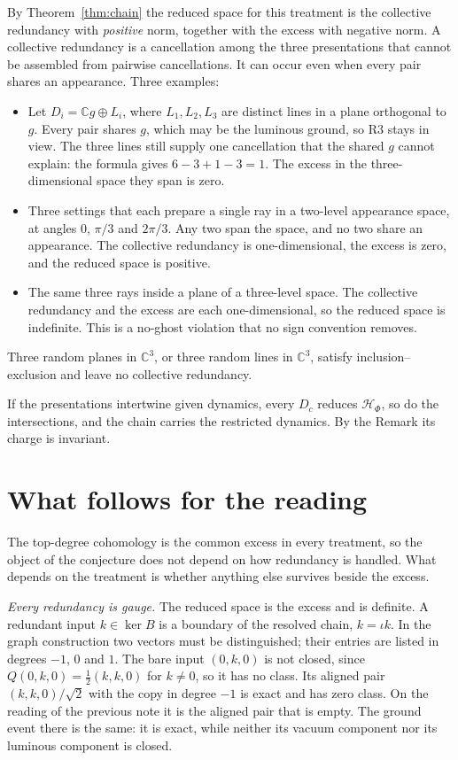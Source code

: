 \documentclass[11pt]{article}
\theoremstyle{remark}
\newcommand{\C}{\mathbb C}
\newcommand{\HF}{\mathcal H_\Phi}
\begin{document}
By Theorem~\ref{thm:chain} the reduced space for this treatment is the collective redundancy with \emph{positive} norm, together with the excess with negative norm. A collective redundancy is a cancellation among the three presentations that cannot be assembled from pairwise cancellations. It can occur even when every pair shares an appearance. Three examples:
\begin{itemize}
\item Let $D_i=\C g\oplus L_i$, where $L_1,L_2,L_3$ are distinct lines in a plane orthogonal to $g$. Every pair shares $g$, which may be the luminous ground, so R3 stays in view. The three lines still supply one cancellation that the shared $g$ cannot explain: the formula gives $6-3+1-3=1$. The excess in the three-dimensional space they span is zero.
\item Three settings that each prepare a single ray in a two-level appearance space, at angles $0$, $\pi/3$ and $2\pi/3$. Any two span the space, and no two share an appearance. The collective redundancy is one-dimensional, the excess is zero, and the reduced space is positive.
\item The same three rays inside a plane of a three-level space. The collective redundancy and the excess are each one-dimensional, so the reduced space is indefinite. This is a no-ghost violation that no sign convention removes.
\end{itemize}
Three random planes in $\C^3$, or three random lines in $\C^3$, satisfy inclusion--exclusion and leave no collective redundancy.

If the presentations intertwine given dynamics, every $D_c$ reduces $\HF$, so do the intersections, and the chain carries the restricted dynamics. By the Remark its charge is invariant.

\section{What follows for the reading}

The top-degree cohomology is the common excess in every treatment, so the object of the conjecture does not depend on how redundancy is handled. What depends on the treatment is whether anything else survives beside the excess.

\emph{Every redundancy is gauge.} The reduced space is the excess and is definite. A redundant input $k\in\ker B$ is a boundary of the resolved chain, $k=\iota k$. In the graph construction two vectors must be distinguished; their entries are listed in degrees $-1$, $0$ and $1$. The bare input $(0,k,0)$ is not closed, since $Q(0,k,0)=\tfrac12(k,k,0)$ for $k\ne0$, so it has no class. Its aligned pair $(k,k,0)/\sqrt2$ with the copy in degree $-1$ is exact and has zero class. On the reading of the previous note it is the aligned pair that is empty. The ground event there is the same: it is exact, while neither its vacuum component nor its luminous component is closed.
\end{document}
